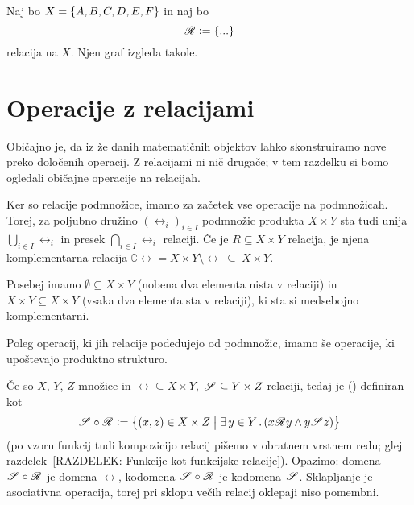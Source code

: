 		\begin{zgled}\label{ZGLED: graf relacije}
			Naj bo $X = \set{A, B, C, D, E, F}$ in naj bo
			\[\rel \dfeq \set{...}\]
			relacija na $X$. Njen graf izgleda takole.
			
		\end{zgled}
	
	
	\section{Operacije z relacijami}\label{RAZDELEK: Operacije z relacijami}
	
		Običajno je, da iz že danih matematičnih objektov lahko skonstruiramo nove preko določenih operacij. Z relacijami ni nič drugače; v tem razdelku si bomo ogledali običajne operacije na relacijah.
		
		Ker so relacije podmnožice, imamo za začetek vse operacije na podmnožicah. Torej, za poljubno družino $(\rel_i)_{i \in I}$ podmnožic produkta $X \times Y$ sta tudi unija $\bigcup_{i \in I} \rel_i$ in presek $\bigcap_{i \in I} \rel_i$ relaciji. Če je $R \subseteq X \times Y$ relacija, je njena komplementarna relacija $\complement{\rel} = X \times Y \setminus \rel \ \subseteq \ X \times Y$.
		
		Posebej imamo  $\emptyset \subseteq X \times Y$ (nobena dva elementa nista v relaciji) in  $X \times Y\subseteq X \times Y$ (vsaka dva elementa sta v relaciji), ki sta si medsebojno komplementarni.
		
		Poleg operacij, ki jih relacije podedujejo od podmnožic, imamo še operacije, ki upoštevajo produktno strukturo.
		
		Če so $X$, $Y$, $Z$ množice in $\rel \subseteq X \times Y$, $\:\!{\mathscr{S}}\:\! \subseteq Y \times Z$ relaciji, tedaj je  ()  definiran kot
		\[\srel \circ \rel \dfeq \set[1]{(x, z) \in X \times Z}{\some{y}[Y]{x \rel y \land y \srel z}}\]
		(po vzoru funkcij tudi kompozicijo relacij pišemo v obratnem vrstnem redu; glej razdelek~\ref{RAZDELEK: Funkcije kot funkcijske relacije}). Opazimo: domena $\:\!{\mathscr{S}}\:\! \circ \:\!{\mathscr{R}}\:\!$ je domena $\rel$, kodomena $\:\!{\mathscr{S}}\:\! \circ \:\!{\mathscr{R}}\:\!$ je kodomena $\:\!{\mathscr{S}}\:\!$. Sklapljanje je asociativna operacija, torej pri sklopu večih relacij oklepaji niso pomembni.
		

